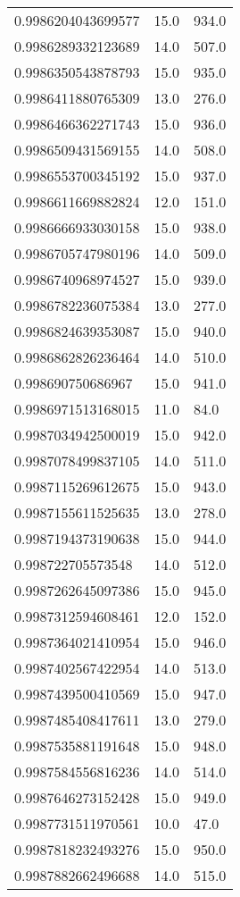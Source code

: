 \begin{center}
\begin{supertabular}[H]{p{0.30\textwidth}p{0.05\textwidth}p{0.05\textwidth}}
0.9986204043699577 & 15.0 & 934.0 \\ 
0.9986289332123689 & 14.0 & 507.0 \\ 
0.9986350543878793 & 15.0 & 935.0 \\ 
0.9986411880765309 & 13.0 & 276.0 \\ 
0.9986466362271743 & 15.0 & 936.0 \\ 
0.9986509431569155 & 14.0 & 508.0 \\ 
0.9986553700345192 & 15.0 & 937.0 \\ 
0.9986611669882824 & 12.0 & 151.0 \\ 
0.9986666933030158 & 15.0 & 938.0 \\ 
0.9986705747980196 & 14.0 & 509.0 \\ 
0.9986740968974527 & 15.0 & 939.0 \\ 
0.9986782236075384 & 13.0 & 277.0 \\ 
0.9986824639353087 & 15.0 & 940.0 \\ 
0.9986862826236464 & 14.0 & 510.0 \\ 
0.998690750686967 & 15.0 & 941.0 \\ 
0.9986971513168015 & 11.0 & 84.0 \\ 
0.9987034942500019 & 15.0 & 942.0 \\ 
0.9987078499837105 & 14.0 & 511.0 \\ 
0.9987115269612675 & 15.0 & 943.0 \\ 
0.9987155611525635 & 13.0 & 278.0 \\ 
0.9987194373190638 & 15.0 & 944.0 \\ 
0.998722705573548 & 14.0 & 512.0 \\ 
0.9987262645097386 & 15.0 & 945.0 \\ 
0.9987312594608461 & 12.0 & 152.0 \\ 
0.9987364021410954 & 15.0 & 946.0 \\ 
0.9987402567422954 & 14.0 & 513.0 \\ 
0.9987439500410569 & 15.0 & 947.0 \\ 
0.9987485408417611 & 13.0 & 279.0 \\ 
0.9987535881191648 & 15.0 & 948.0 \\ 
0.9987584556816236 & 14.0 & 514.0 \\ 
0.9987646273152428 & 15.0 & 949.0 \\ 
0.9987731511970561 & 10.0 & 47.0 \\ 
0.9987818232493276 & 15.0 & 950.0 \\ 
0.9987882662496688 & 14.0 & 515.0 \\ 

\end{supertabular}
\end{center}
